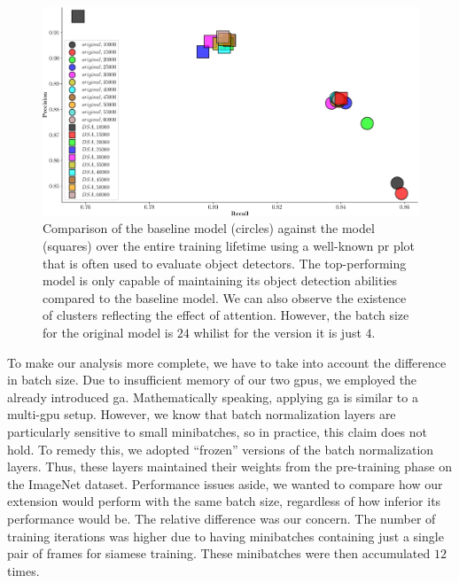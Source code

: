 \begin{figure}[t]
  \centerline{\includegraphics[width=\linewidth]{figures/siamese_tracking/tracker_cmp_160_2x12_vs_160_2x2_DSA_rec_prec.pdf}}
  \caption[\gls{dsa} evaluation - secondary metrics]{Comparison of the baseline model (circles) against the \dsamodel{} model (squares) over the entire training lifetime using a well-known \gls{pr} plot that is often used to evaluate object detectors. The top-performing \dsamodel{} model is only capable of maintaining its object detection abilities compared to the baseline model. We can also observe the existence of clusters reflecting the effect of attention. However, the batch size for the original model is $24$ whilist for the \dsamodel{} version it is just $4$.}
  \label{fig:OrigVsDSA_160RPN_Prec_Rec}
\end{figure}

To make our analysis more complete, we have to take into account the difference in batch size. Due to insufficient memory of our two \glspl{gpu}, we employed the already introduced \gls{ga}. Mathematically speaking, applying \gls{ga} is similar to a multi-\gls{gpu} setup. However, we know that batch normalization layers are particularly sensitive to small minibatches, so in practice, this claim does not hold. To remedy this, we adopted ``frozen'' versions of the batch normalization layers. Thus, these layers maintained their weights from the pre-training phase on the ImageNet dataset. Performance issues aside, we wanted to compare how our extension would perform with the same batch size, regardless of how inferior its performance would be. The relative difference was our concern. The number of training iterations was higher due to having minibatches containing just a single pair of frames for siamese training. These minibatches were then accumulated $12$ times.

